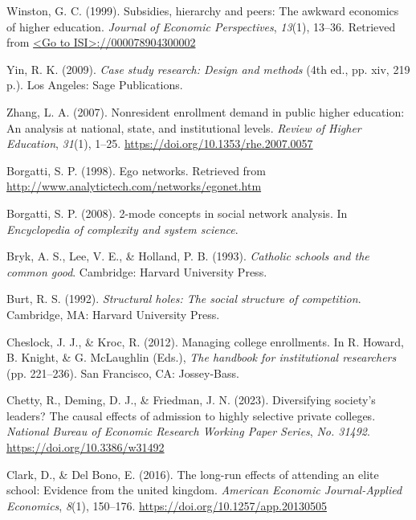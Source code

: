 \documentclass[
  12pt,
]{article}
\newlength{\cslhangindent}
\newenvironment{CSLReferences}[2] %
 {\begin{list}{}{%
  \setlength{\itemindent}{0pt}
  \setlength{\leftmargin}{0pt}
  \setlength{\parsep}{0pt}
  \ifodd #1
   \setlength{\leftmargin}{\cslhangindent}
   \setlength{\itemindent}{-1\cslhangindent}
  \fi
  \setlength{\itemsep}{#2\baselineskip}}}
 {\end{list}}
\begin{document}
\begin{CSLReferences}{1}{0}
Winston, G. C. (1999). Subsidies, hierarchy and peers: The awkward economics of higher education. \emph{Journal of Economic Perspectives}, \emph{13}(1), 13--36. Retrieved from \href{\%3CGo\%20to\%20ISI\%3E://000078904300002}{\textless Go to ISI\textgreater://000078904300002}

Yin, R. K. (2009). \emph{Case study research: Design and methods} (4th ed., pp. xiv, 219 p.). Los Angeles: Sage Publications.

Zhang, L. A. (2007). Nonresident enrollment demand in public higher education: An analysis at national, state, and institutional levels. \emph{Review of Higher Education}, \emph{31}(1), 1--25. \url{https://doi.org/10.1353/rhe.2007.0057}

Borgatti, S. P. (1998). Ego networks. Retrieved from \url{http://www.analytictech.com/networks/egonet.htm}

Borgatti, S. P. (2008). 2-mode concepts in social network analysis. In \emph{Encyclopedia of complexity and system science}.

Bryk, A. S., Lee, V. E., \& Holland, P. B. (1993). \emph{Catholic schools and the common good}. Cambridge: Harvard University Press.

Burt, R. S. (1992). \emph{Structural holes: The social structure of competition}. Cambridge, MA: Harvard University Press.

Cheslock, J. J., \& Kroc, R. (2012). Managing college enrollments. In R. Howard, B. Knight, \& G. McLaughlin (Eds.), \emph{The handbook for institutional researchers} (pp. 221--236). San Francisco, CA: Jossey-Bass.

Chetty, R., Deming, D. J., \& Friedman, J. N. (2023). Diversifying society's leaders? The causal effects of admission to highly selective private colleges. \emph{National Bureau of Economic Research Working Paper Series}, \emph{No. 31492}. \url{https://doi.org/10.3386/w31492}

Clark, D., \& Del Bono, E. (2016). The long-run effects of attending an elite school: Evidence from the united kingdom. \emph{American Economic Journal-Applied Economics}, \emph{8}(1), 150--176. \url{https://doi.org/10.1257/app.20130505}


\end{CSLReferences}
\end{document}
